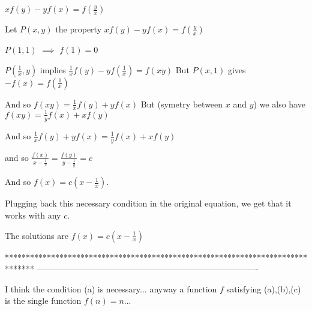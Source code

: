 \begin{solution}
	\begin{tcolorbox}$ xf(y) - yf(x) = f\left( {\frac {y}{x}} \right)$\end{tcolorbox}

Let $ P(x,y)$ the property $ xf(y) - yf(x) = f\left( {\frac {y}{x}} \right)$

$ P(1,1)$ $ \implies$ $ f(1)=0$

$ P(\frac{1}{x},y)$ implies $ \frac{1}{x}f(y) - yf(\frac{1}{x}) = f(xy)$
But $ P(x,1)$ gives $ - f(x) = f( \frac {1}{x})$

And so $ f(xy)=\frac{1}{x}f(y) + yf(x)$
But (symetry between $ x$ and $ y$) we also have  $ f(xy)=\frac{1}{y}f(x) + xf(y)$

And so $ \frac{1}{x}f(y) + yf(x)=\frac{1}{y}f(x) + xf(y)$

and so $ \frac{f(x)}{x-\frac{1}{x}}= \frac{f(y)}{y-\frac{1}{y}}=c$

And so $ f(x)=c(x-\frac{1}{x})$.

Plugging back this necessary condition in the original equation, we get that it works with any $ c$.

The solutions are $ \boxed{f(x)=c(x-\frac{1}{x})}$
\end{solution}
*******************************************************************************
-------------------------------------------------------------------------------




\begin{solution}
	I think the condition (a) is necessary...
anyway a function $ f$ satisfying (a),(b),(c) is the single function $ f(n)=n$...
\end{solution}



